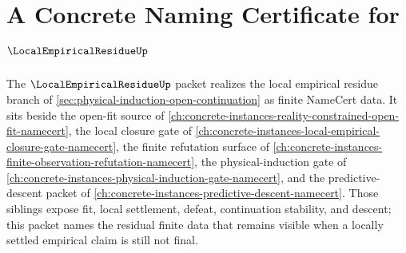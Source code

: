 \chapter{A Concrete Naming Certificate for $\LocalEmpiricalResidueUp$}
\label{ch:concrete-instances-local-empirical-residue-namecert}

The $\LocalEmpiricalResidueUp$ packet realizes the local empirical residue branch of \autoref{sec:physical-induction-open-continuation} as finite NameCert data. It sits beside the open-fit source of \autoref{ch:concrete-instances-reality-constrained-open-fit-namecert}, the local closure gate of \autoref{ch:concrete-instances-local-empirical-closure-gate-namecert}, the finite refutation surface of \autoref{ch:concrete-instances-finite-observation-refutation-namecert}, the physical-induction gate of \autoref{ch:concrete-instances-physical-induction-gate-namecert}, and the predictive-descent packet of \autoref{ch:concrete-instances-predictive-descent-namecert}. Those siblings expose fit, local settlement, defeat, continuation stability, and descent; this packet names the residual finite data that remains visible when a locally settled empirical claim is still not final.

